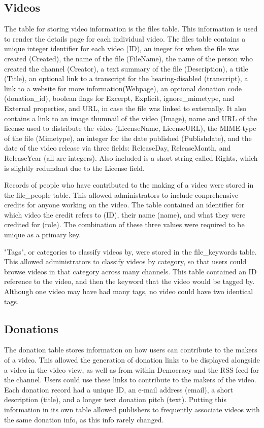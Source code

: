 \documentclass[a4paper,12pt]{report}
\begin{document}
\subsection{Videos}
	The table for storing video information is the files table. This information is used to render the details page for each individual video. The files table contains a unique integer identifier for each video (ID), an ineger for when the file was created (Created), the name of the file (FileName), the name of the person who created the channel (Creator), a text summary of the file (Description), a title (Title), an optional link to a transcript for the hearing-disabled (transcript), a link to a website for more information(Webpage), an optional donation code (donation_id), boolean flags for Excerpt, Explicit, ignore_mimetype, and External properties, and URL, in case the file was linked to externally. It also contains a link to an image thumnail of the video (Image), name and URL of the license used to distribute the video (LicenseName, LicenseURL), the MIME-type of the file (Mimetype), an integer for the date published (Publishdate), and the date of the video release via three fields: ReleaseDay, ReleaseMonth, and ReleaseYear (all are integers). Also included is a short string called Rights, which is slightly redundant due to the License field. 

	Records of people who have contributed to the making of a video were stored in the file_people table. This allowed administrators to include conprehensive credits for anyone working on the video. The table contained an identifier for which video the credit refers to (ID), their name (name), and what they were credited for (role). The combination of these three values were required to be unique as a primary key.

	"Tags", or categories to classify videos by, were stored in the file_keywords table. This allowed administrators to classify videos by category, so that users could browse videos in that category across many channels. This table contained an ID reference to the video, and then the keyword that the video would be tagged by. Although one video may have had many tags, no video could have two identical tags.

\subsection{Donations}
	The donation table stores information on how users can contribute to the makers of a video. This allowed the generation of donation links to be displayed alongside a video in the video view, as well as from within Democracy and the RSS feed for the channel. Users could use these links to contribute to the makers of the video. Each donation record had a unique ID, an e-mail address (email), a short description (title), and a longer text donation pitch (text). Putting this information in its own table allowed publishers to frequently associate videos with the same donation info, as this info rarely changed. 
\end{document}
